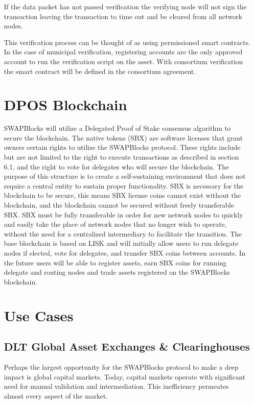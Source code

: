 \documentclass[12pt]{article}
\begin{document}
If the data packet has not passed verification the verifying node will not sign the transaction
leaving the transaction to time out and be cleared from all network nodes.

This verification process can be thought of as using permissioned smart contracts.  In the case of municipal
verification, registering accounts are the only approved account to run the verification script on the asset.
With consortium verification the smart contract will be defined in the consortium agreement.


\section{DPOS Blockchain}
SWAPBlocks will utilize a Delegated Proof of Stake consensus algorithm to secure the blockchain. The native 
tokens (SBX) are software licenses that grant owners certain rights to utilize the SWAPBlocks protocol. These 
rights include but are not limited to the right to execute transactions as described in section 6.1, and 
the right to vote for delegates who will secure the blockchain. The purpose of this structure is to create a 
self-sustaining environment that does not require a central entity to sustain proper functionality. SBX is necessary 
for the blockchain to be secure, this means SBX license coins cannot exist without the blockchain, and the 
blockchain cannot be secured without freely transferable SBX. SBX must be fully transferable in order for new network 
nodes to quickly and easily take the place of network nodes that no longer wish to operate, without the need for 
a centralized intermediary to facilitate the transition. The base blockchain is based on LISK and will initially allow 
users to run delegate nodes if elected, vote for delegates, and transfer SBX coins between accounts. In the future 
users will be able to register assets, earn SBX coins for running delegate and routing nodes and trade assets 
registered on the SWAPBlocks blockchain.  


\pagebreak

\section{Use Cases}

\subsection{DLT Global Asset Exchanges \& Clearinghouses}
Perhaps the largest opportunity for the SWAPBlocks protocol to make a deep impact is global capital markets. Today, 
capital markets operate with significant need for manual validation and intermediation. This inefficiency permeates 
almost every aspect of the market.
\end{document}
